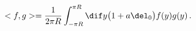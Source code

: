 \begin{equation}
<f,g> = \frac{1}{2\pi R} \int_{-\pi R}^{\pi R} \dif y \big (1+a
\del_0 \big) f(y) g(y) \, .  \label{scalarprod}
\end{equation}

